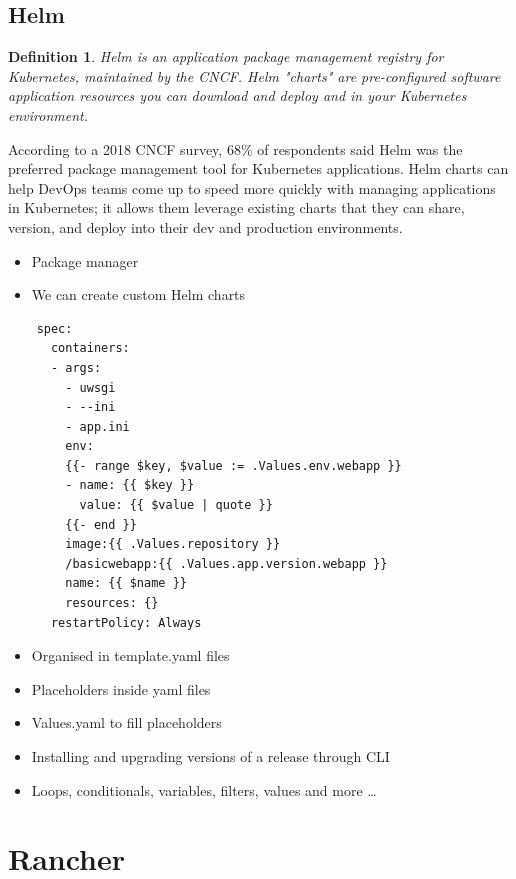 \documentclass{article}
\newtheorem{theorem}{Definition}[section]
\begin{document}
\subsection{Helm}


\begin{theorem}
    Helm is an application package management registry for Kubernetes, maintained by the CNCF. 
    Helm "charts" are pre-configured software application resources you can download and deploy and in your Kubernetes environment.
\end{theorem}

According to a 2018 CNCF survey, 68\% of respondents said Helm was the preferred package management tool for Kubernetes applications. 
Helm charts can help DevOps teams come up to speed more quickly with managing applications in Kubernetes; 
it allows them leverage existing charts that they can share, version, and deploy into their dev and production environments.

\begin{itemize}
    \item Package manager
    \item We can create custom Helm charts
\end{itemize}

\begin{verbatim}
    spec:
      containers:
      - args:
        - uwsgi
        - --ini
        - app.ini
        env:
        {{- range $key, $value := .Values.env.webapp }}
        - name: {{ $key }}
          value: {{ $value | quote }}
        {{- end }}
        image:{{ .Values.repository }}
        /basicwebapp:{{ .Values.app.version.webapp }}
        name: {{ $name }}
        resources: {}
      restartPolicy: Always
\end{verbatim}

\begin{itemize}
    \item Organised in template.yaml files
    \item Placeholders inside yaml files
    \item Values.yaml to fill placeholders
    \item Installing and upgrading versions of a release through CLI
    \item Loops, conditionals, variables, filters, values and more …
\end{itemize}

\section{Rancher}
\end{document}
